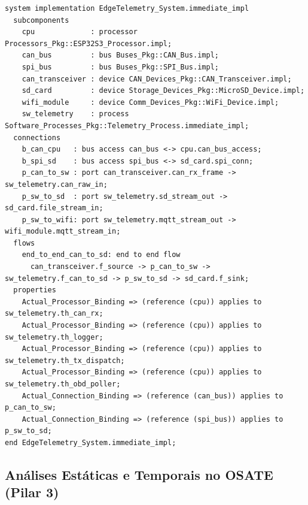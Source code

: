 \begin{lstlisting}[language=AADL, caption={Estrutura da implementação raiz do sistema no OSATE.}, label={lst:aadl_system_impl}]
system implementation EdgeTelemetry_System.immediate_impl
  subcomponents
    cpu             : processor Processors_Pkg::ESP32S3_Processor.impl;
    can_bus         : bus Buses_Pkg::CAN_Bus.impl;
    spi_bus         : bus Buses_Pkg::SPI_Bus.impl;
    can_transceiver : device CAN_Devices_Pkg::CAN_Transceiver.impl;
    sd_card         : device Storage_Devices_Pkg::MicroSD_Device.impl;
    wifi_module     : device Comm_Devices_Pkg::WiFi_Device.impl;
    sw_telemetry    : process Software_Processes_Pkg::Telemetry_Process.immediate_impl;
  connections
    b_can_cpu   : bus access can_bus <-> cpu.can_bus_access;
    b_spi_sd    : bus access spi_bus <-> sd_card.spi_conn;
    p_can_to_sw : port can_transceiver.can_rx_frame -> sw_telemetry.can_raw_in;
    p_sw_to_sd  : port sw_telemetry.sd_stream_out -> sd_card.file_stream_in;
    p_sw_to_wifi: port sw_telemetry.mqtt_stream_out -> wifi_module.mqtt_stream_in;
  flows
    end_to_end_can_to_sd: end to end flow 
      can_transceiver.f_source -> p_can_to_sw -> sw_telemetry.f_can_to_sd -> p_sw_to_sd -> sd_card.f_sink;
  properties
    Actual_Processor_Binding => (reference (cpu)) applies to sw_telemetry.th_can_rx;
    Actual_Processor_Binding => (reference (cpu)) applies to sw_telemetry.th_logger;
    Actual_Processor_Binding => (reference (cpu)) applies to sw_telemetry.th_tx_dispatch;
    Actual_Processor_Binding => (reference (cpu)) applies to sw_telemetry.th_obd_poller;
    Actual_Connection_Binding => (reference (can_bus)) applies to p_can_to_sw;
    Actual_Connection_Binding => (reference (spi_bus)) applies to p_sw_to_sd;
end EdgeTelemetry_System.immediate_impl;
\end{lstlisting}

\subsection{Análises Estáticas e Temporais no OSATE (Pilar 3)}
\label{subsec:pilar3_detalhe}

